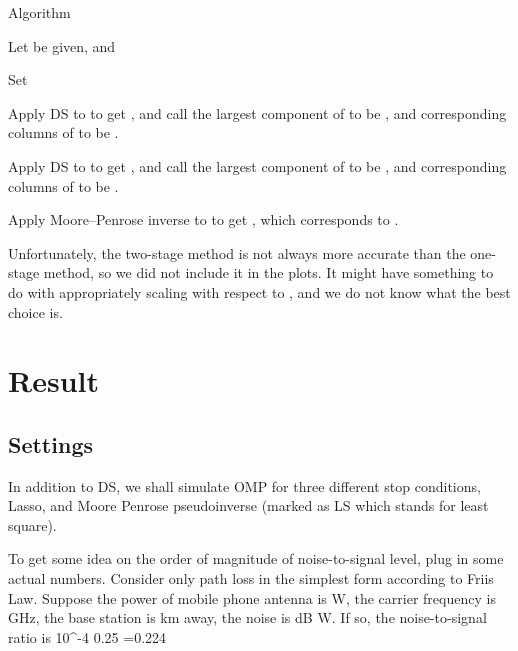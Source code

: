 \Result
{Algorithm}
{
\startitemize[n]
\item Let  be given, and 

\item Set

\item Apply DS to  to get , and call the  largest component of  to be , and corresponding columns of  to be .

\item Apply DS to  to get , and call the  largest component of  to be , and corresponding columns of  to be .

\item Apply Moore–Penrose inverse to  to get , which corresponds to .
\stopitemize
}

Unfortunately, the two-stage method is not always more accurate than the one-stage method, so we did not include it in the plots.
It might have something to do with appropriately scaling  with respect to , and we do not know what the best choice is.



\section {Result}

\subsection {Settings}

In addition to DS, we shall simulate OMP for three different stop conditions, Lasso, and Moore Penrose pseudoinverse (marked as LS which stands for least square).

To get some idea on the order of magnitude of noise-to-signal level, plug in some actual numbers.
Consider only path loss in the simplest form according to Friis Law.
Suppose the power of mobile phone antenna is  W,
the carrier frequency is  GHz,
the base station is  km away,
the noise is  dB W.
If so, the noise-to-signal ratio is
 {
10^{-4}  {0.25} 
=0.224 \\
}

